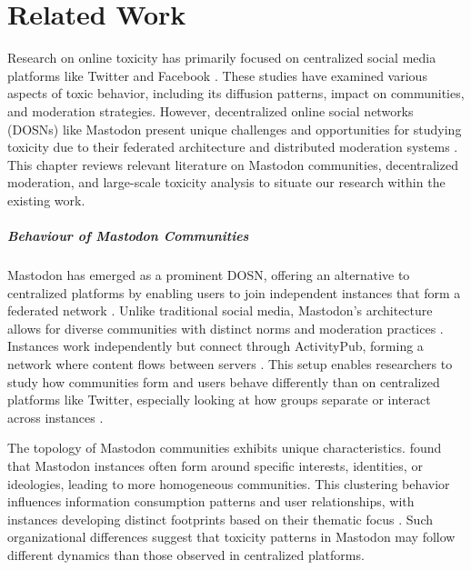 \chapter{Related Work}

Research on online toxicity has primarily focused on centralized social media platforms like Twitter and Facebook \cite{fan:2022,nicholson:2023}. These studies have examined various aspects of toxic behavior, including its diffusion patterns, impact on communities, and moderation strategies. However, decentralized online social networks (DOSNs) like Mastodon present unique challenges and opportunities for studying toxicity due to their federated architecture and distributed moderation systems \cite{bono:2024}. This chapter reviews relevant literature on Mastodon communities, decentralized moderation, and large-scale toxicity analysis to situate our research within the existing work.

\paragraph{Behaviour of Mastodon Communities}
Mastodon has emerged as a prominent DOSN, offering an alternative to centralized platforms by enabling users to join independent instances that form a federated network \cite{zulli:2020}. Unlike traditional social media, Mastodon's architecture allows for diverse communities with distinct norms and moderation practices \cite{la_cava:2021}. Instances work independently but connect through ActivityPub, forming a network where content flows between servers \cite{mastodon:docs}. This setup enables researchers to study how communities form and users behave differently than on centralized platforms like Twitter, especially looking at how groups separate or interact across instances \cite{zignani:2018}.

The topology of Mastodon communities exhibits unique characteristics. \citet{zulli:2020} found that Mastodon instances often form around specific interests, identities, or ideologies, leading to more homogeneous communities. This clustering behavior influences information consumption patterns and user relationships, with instances developing distinct footprints based on their thematic focus \cite{la_cava:2021}. Such organizational differences suggest that toxicity patterns in Mastodon may follow different dynamics than those observed in centralized platforms.

